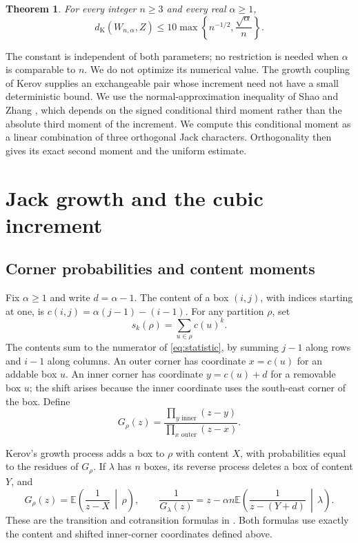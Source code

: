 \documentclass[11pt]{article}
\newtheorem{theorem}{Theorem}[section]
\newcommand{\E}{\mathbb E}
\newcommand{\dK}{d_{\mathrm K}}
\begin{document}
\begin{theorem}\label{thm:main}
For every integer $n\ge3$ and every real $\alpha\ge1$,
\begin{equation}\label{eq:main}
 \dK(W_{n,\alpha},Z)
 \le 10\max\left\{n^{-1/2},\frac{\sqrt\alpha}{n}\right\}.
\end{equation}
\end{theorem}

The constant is independent of both parameters; no restriction is needed
when $\alpha$ is comparable to $n$. We do not optimize its numerical value.
The growth coupling of Kerov \cite{Kerov} supplies an exchangeable pair
whose increment need not have a small deterministic bound. We use the
normal-approximation inequality of Shao and Zhang \cite{SZ}, which depends
on the signed conditional third moment rather than the absolute third
moment of the increment. We compute this conditional moment as a linear
combination of three orthogonal Jack characters. Orthogonality then gives
its exact second moment and the uniform estimate.

\section{Jack growth and the cubic increment}

\subsection{Corner probabilities and content moments}

Fix $\alpha\ge1$ and write $d=\alpha-1$. The content of a box $(i,j)$,
with indices starting at one, is
$c(i,j)=\alpha(j-1)-(i-1)$. For any partition $\rho$, set
\[
 s_k(\rho)=\sum_{u\in\rho}c(u)^k.
\]
The contents sum to the numerator of \eqref{eq:statistic}, by summing $j-1$
along rows and $i-1$ along columns.
An outer corner has coordinate $x=c(u)$ for an addable box $u$.
An inner corner has coordinate $y=c(u)+d$ for a removable box $u$;
the shift arises because the inner coordinate uses the south-east corner
of the box. Define
\begin{equation}\label{eq:G}
 G_\rho(z)=\frac{\prod_{y\text{ inner}}(z-y)}{\prod_{x\text{ outer}}(z-x)}.
\end{equation}

Kerov's growth process adds a box to $\rho$ with content $X$, with
probabilities equal to the residues of $G_\rho$. If $\lambda$ has $n$ boxes,
its reverse process deletes a box of content $Y$, and
\begin{equation}\label{eq:transforms}
 G_\rho(z)=\E\left(\frac1{z-X}\,\middle|\,\rho\right),\qquad
 \frac1{G_\lambda(z)}
   =z-\alpha n\E\left(\frac1{z-(Y+d)}\,\middle|\,\lambda\right).
\end{equation}
These are the transition and cotransition formulas in
\cite[Section~2, Theorem~6.7 and Lemma~7.2]{Kerov}.
Both formulas use exactly the content and shifted inner-corner coordinates
defined above.
\end{document}
